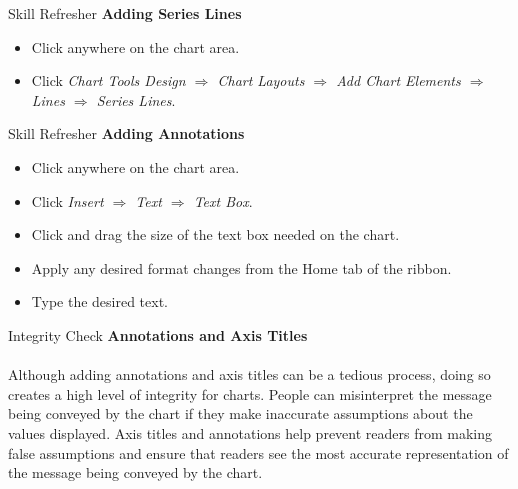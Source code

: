 \begin{center}
	\begin{sklbox}{Skill Refresher}
		\textbf{Adding Series Lines}
		\\
		\begin{itemize}
			\setlength{\itemsep}{0pt}
			\setlength{\parskip}{0pt}
			\setlength{\parsep}{0pt}
			
			\item Click anywhere on the chart area.
			\item Click \textit{Chart Tools Design $ \Rightarrow $ Chart Layouts $ \Rightarrow $ Add Chart Elements $ \Rightarrow $ Lines $ \Rightarrow $ Series Lines}.
		\end{itemize}
	\end{sklbox}
\end{center}

\begin{center}
	\begin{sklbox}{Skill Refresher}
		\textbf{Adding Annotations}
		\\
		\begin{itemize}
			\setlength{\itemsep}{0pt}
			\setlength{\parskip}{0pt}
			\setlength{\parsep}{0pt}
			
			\item Click anywhere on the chart area.
			\item Click \textit{Insert $ \Rightarrow $ Text $ \Rightarrow $ Text Box}.
			\item Click and drag the size of the text box needed on the chart.
			\item Apply any desired format changes from the Home tab of the ribbon.
			\item Type the desired text.
			
		\end{itemize}
	\end{sklbox}
\end{center}

\begin{center}
	\begin{infobox}{Integrity Check}
		\textbf{Annotations and Axis Titles}
		\\
		\\
		Although adding annotations and axis titles can be a tedious process, doing so creates a high level of integrity for charts. People can misinterpret the message being conveyed by the chart if they make inaccurate assumptions about the values displayed. Axis titles and annotations help prevent readers from making false assumptions and ensure that readers see the most accurate representation of the message being conveyed by the chart.		
	\end{infobox}
\end{center}

